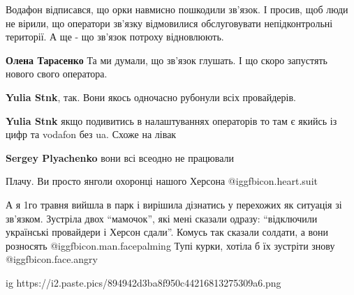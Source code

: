  
 
 
 
 
\zzSecCmt

\raggedcolumns
\begin{multicols}{2} %
\setlength{\parindent}{0pt}


Водафон відписався, що орки навмисно пошкодили зв'язок. І просив, щоб люди не
вірили, що оператори зв'язку відмовилися обслуговувати непідконтрольні
території. А ще - що зв'язок потроху відновлюють.

\textbf{Олена Тарасенко} Та ми думали, що зв'язок глушать. І що скоро запустять нового свого оператора.

\textbf{Yulia Stnk}, так. Вони якось одночасно рубонули всіх провайдерів.

\textbf{Yulia Stnk} якщо подивитись в налаштуваннях операторів то там є якийсь із цифр та vodafon без ua. Схоже на лівак

\textbf{Sergey Plyachenko} вони всі всеодно не працювали

Плачу. Ви просто янголи охоронці нашого Херсона @igg{fbicon.heart.suit}


А я 1го травня вийшла в парк і вирішила дізнатись у перехожих як ситуація зі
зв'язком. Зустріла двох \enquote{мамочок}, які мені сказали одразу:
\enquote{відключили українські провайдери і Херсон сдали}. Комусь так сказали
солдати, а вони розносять @igg{fbicon.man.facepalming} Тупі курки, хотіла б їх
зустріти знову @igg{fbicon.face.angry} 

\ifcmt
  ig https://i2.paste.pics/894942d3ba8f950c44216813275309a6.png
\fi

\end{multicols} %
